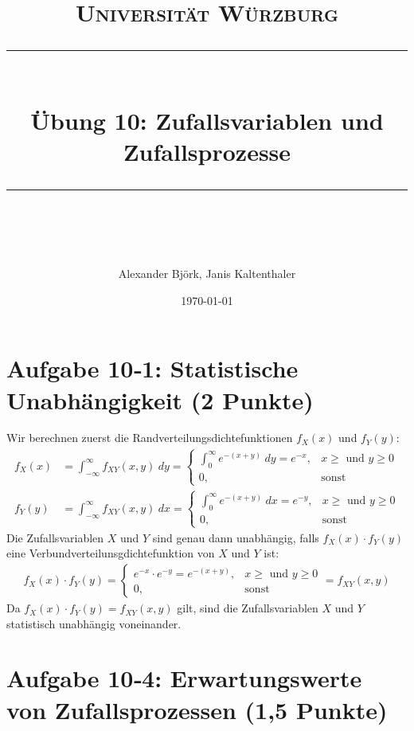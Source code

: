 \documentclass[11pt]{scrartcl} %
\title{	
	\normalfont\normalsize
	\textsc{Universität Würzburg}\\ %
	\vspace{25pt} %
	\rule{\linewidth}{0.5pt}\\ %
	\vspace{20pt} %
	{\huge Übung 10: Zufallsvariablen und Zufallsprozesse}\\ %
	\vspace{12pt} %
	\rule{\linewidth}{2pt}\\ %
	\vspace{12pt} %
}
\author{\LARGE Alexander Björk, Janis Kaltenthaler} %
\date{\normalsize\today} %
\begin{document}
\maketitle %


\section*{Aufgabe 10‐1: Statistische Unabhängigkeit (2 Punkte)} 
Wir berechnen zuerst die Randverteilungsdichtefunktionen $f_X(x)$ und $f_Y(y)$:
\begin{align*}
	f_X(x)&=\int_{-\infty}^{\infty}f_{XY}(x,y)\hspace{3pt}dy=\begin{cases}\int_{0}^{\infty}e^{-(x+y)}\hspace{3pt}dy=e^{-x}, & x\ge\text{ und }y \ge0 \\0, & \text{sonst} \end{cases}\\
	f_Y(y)&=\int_{-\infty}^{\infty}f_{XY}(x,y)\hspace{3pt}dx=\begin{cases}\int_{0}^{\infty}e^{-(x+y)}\hspace{3pt}dx=e^{-y}, & x\ge\text{ und }y \ge0 \\0, & \text{sonst} \end{cases}
\end{align*}
Die Zufallsvariablen $X$ und $Y$ sind genau dann unabhängig, falls $f_X(x)\cdot f_Y(y)$ eine Verbundverteilunsgdichtefunktion von $X$ und $Y$ ist:
\begin{align*}
	f_X(x)\cdot f_Y(y)=\begin{cases}e^{-x}\cdot e^{-y}=e^{-(x+y)}, & x\ge\text{ und }y \ge0 \\0, & \text{sonst} \end{cases}=f_{XY}(x,y)
\end{align*}
Da $f_X(x)\cdot f_Y(y)=f_{XY}(x,y)$ gilt, sind die Zufallsvariablen $X$ und $Y$ statistisch unabhängig voneinander.
\section*{Aufgabe 10‐4: Erwartungswerte von Zufallsprozessen (1,5 Punkte)}
\end{document}
